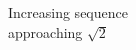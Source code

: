 \documentclass[preview]{standalone}
\begin{document}
\begin{center}
Increasing sequence\\approaching $\sqrt{2}$
\end{center}
\end{document}
